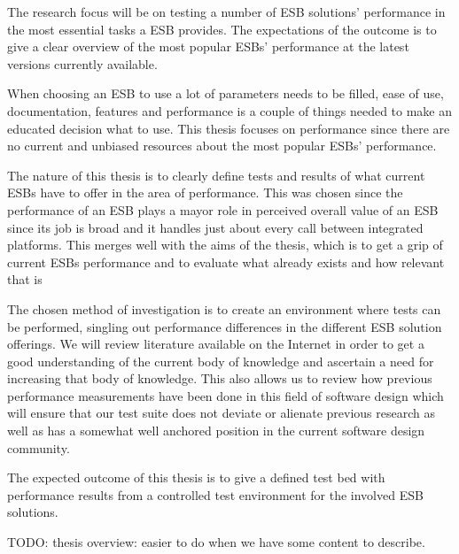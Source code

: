 \documentclass{llncs}
\begin{document}
The research focus will be on testing a number of ESB solutions' performance in the most essential tasks a ESB provides. The expectations of the outcome is to give a clear overview of the most popular ESBs' performance at the latest versions currently available.

When choosing an ESB to use a lot of parameters needs to be filled, ease of use, documentation, features and performance is a couple of things needed to make an educated decision what to use. This thesis focuses on performance since there are no current and unbiased resources about the most popular ESBs' performance.

The nature of this thesis is to clearly define tests and results of what current ESBs have to offer in the area of performance. This was chosen since the performance of an ESB plays a mayor role in perceived overall value of an ESB since its job is broad and it handles just about every call between integrated platforms. This merges well with the aims of the thesis, which is to get a grip of current ESBs performance and to evaluate what already exists and how relevant that is

The chosen method of investigation is to create an environment where tests can be performed, singling out performance differences in the different ESB solution offerings.
We will review literature available on the Internet in order to get a good understanding of the current body of knowledge and ascertain a need for increasing that body of knowledge. This also allows us to review how previous performance measurements have been done in this field of software design which will ensure that our test suite does not deviate or alienate previous research as well as has a somewhat well anchored position in the current software design community.


The expected outcome of this thesis is to give a defined test bed with performance results from a controlled test environment for the involved ESB solutions.


TODO: thesis overview: easier to do when we have some content to describe.
\end{document}
